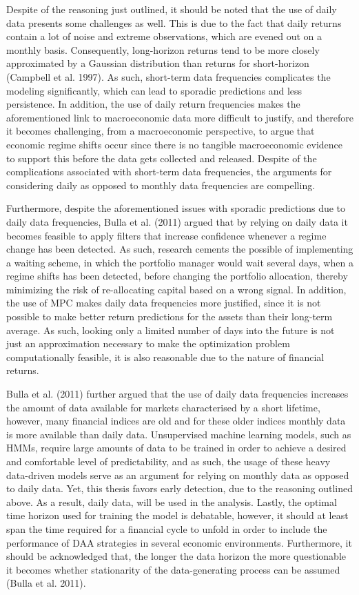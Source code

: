Despite of the reasoning just outlined, it should be noted that the use of daily data presents some challenges as well. This is due to the fact that daily returns contain a lot of noise and extreme observations, which are evened out on a monthly basis. Consequently, long-horizon returns tend to be more closely approximated by a Gaussian distribution than returns for short-horizon (Campbell et al. 1997). As such, short-term data frequencies complicates the modeling significantly, which can lead to sporadic predictions and less persistence. In addition, the use of daily return frequencies makes the aforementioned link to macroeconomic data more difficult to justify, and therefore it becomes challenging, from a macroeconomic perspective, to argue that economic regime shifts occur since there is no tangible macroeconomic evidence to support this before the data gets collected and released. Despite of the complications associated with short-term data frequencies, the arguments for considering daily as opposed to monthly data frequencies are compelling. 

Furthermore, despite the aforementioned issues with sporadic predictions due to daily data frequencies, Bulla et al. (2011) argued that by relying on daily data it becomes feasible to apply filters that increase confidence whenever a regime change has been detected. As such, research cements the possible of implementing a waiting scheme, in which the portfolio manager would wait several days, when a regime shifts has been detected, before changing the portfolio allocation, thereby minimizing the risk of re-allocating capital based on a wrong signal. In addition, the use of MPC makes daily data frequencies more justified, since it is not possible to make better return predictions for the assets than their long-term average. As such, looking only a limited number of days into the future is not just an approximation necessary to make the optimization problem computationally feasible, it is also reasonable due to the nature of financial returns.

Bulla et al. (2011) further argued that the use of daily data frequencies increases the amount of data available for markets characterised by a short lifetime, however, many financial indices are old and for these older indices monthly data is more available than daily data. Unsupervised machine learning models, such as HMMs, require large amounts of data to be trained in order to achieve a desired and comfortable level of predictability, and as such, the usage of these heavy data-driven models serve as an argument for relying on monthly data as opposed to daily data. Yet, this thesis favors early detection, due to the reasoning outlined above. As a result, daily data, will be used in the analysis. Lastly, the optimal time horizon used for training the model is debatable, however, it should at least span the time required for a financial cycle to unfold in order to include the performance of DAA strategies in several economic environments. Furthermore, it should be acknowledged that, the longer the data horizon the more questionable it becomes whether stationarity of the data-generating process can be assumed (Bulla et al. 2011).

